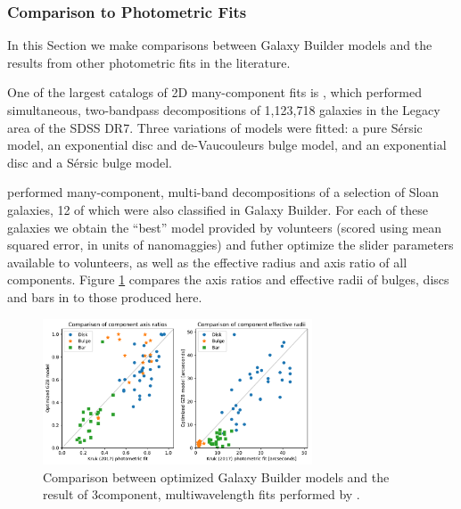\documentclass[../main.tex]{subfiles}
\begin{document}


\subsubsection{Comparison to Photometric Fits}
In this Section we make comparisons between Galaxy Builder models and the results from other photometric fits in the literature.

One of the largest catalogs of 2D many-component fits is \citet{Simard2011:1107.1518v1}, which performed simultaneous, two-bandpass decompositions of 1,123,718 galaxies in the Legacy area of the SDSS DR7. Three variations of models were fitted: a pure S\'ersic model, an exponential disc and de-Vaucouleurs bulge model, and an exponential disc and a S\'ersic bulge model.

\citet{Kruk2017:1710.00093v2} performed many-component, multi-band decompositions of a selection of Sloan galaxies, 12 of which were also classified in Galaxy Builder. For each of these galaxies we obtain the ``best'' model provided by volunteers (scored using mean squared error, in units of nanomaggies) and futher optimize the slider parameters available to volunteers, as well as the effective radius and axis ratio of all components. Figure \ref{fig:sd_comp_comparison} compares the axis ratios and effective radii of bulges, discs and bars in \citet{Kruk2017:1710.00093v2} to those produced here.

\begin{figure}
  \includegraphics[width=8cm]{images__results/sd_comp_comparison.pdf}
  \caption{Comparison between optimized Galaxy Builder models and the result of 3\-component, multi\-wavelength fits performed by \citet{Kruk2017:1710.00093v2}.}
  \label{fig:sd_comp_comparison}
\end{figure}
\end{document}
